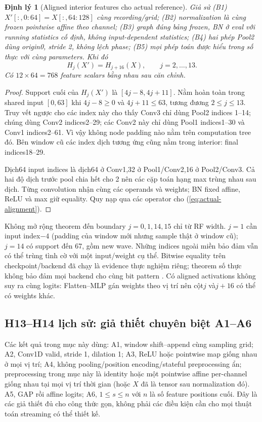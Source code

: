 \documentclass[11pt,a4paper]{article}
\newtheorem{theorem}[definition]{Định lý}
\theoremstyle{remark}
\begin{document}
\begin{theorem}[Aligned interior features cho actual reference]\label{th:actual-feature}
Giả sử (B1) $X'[:,0:64]=X[:,64:128]$ cùng recording/grid;
(B2) normalization là cùng frozen pointwise affine theo channel;
(B3) graph đúng bảng frozen, BN ở eval với running statistics cố định,
không input-dependent statistics;
(B4) hai phép Pool2 dùng origin0, stride 2, không lệch phase;
(B5) mọi phép toán được hiểu trong số thực với cùng parameters.
Khi đó
\begin{equation}
 H_j(X')=H_{j+16}(X),\qquad j=2,\ldots,13.
 \label{eq:actual-alignment}
\end{equation}
Có $12\times64=768$ feature scalars bằng nhau sau căn chỉnh.
\end{theorem}
\begin{proof}
Support cuối của $H_j(X')$ là $[4j-8,4j+11]$.
Nằm hoàn toàn trong shared input $[0,63]$ khi
$4j-8\ge0$ và $4j+11\le63$, tương đương $2\le j\le13$.
Truy vết ngược cho các index này cho thấy Conv3 chỉ dùng Pool2 indices
1--14; chúng dùng Conv2 indices2--29; các Conv2 này chỉ dùng Pool1
indices1--30 và Conv1 indices2--61. Vì vậy không node padding nào nằm
trên computation tree đó. Bên window cũ các index dịch tương ứng cũng
nằm trong interior: final indices18--29.

Dịch64 input indices là dịch64 ở Conv1,32 ở Pool1/Conv2,16 ở
Pool2/Conv3. Cả hai độ dịch trước pool chia hết cho 2 nên các cặp toán
hạng max trùng nhau sau dịch. Từng convolution nhận cùng các operands
và weights; BN fixed affine, ReLU và max giữ equality. Quy nạp qua các
operator cho (\ref{eq:actual-alignment}).
\end{proof}
Không mở rộng theorem đến boundary $j=0,1,14,15$ chỉ từ RF width.
$j=1$ cần input index$-4$ (padding của window mới nhưng sample thật ở
window cũ); $j=14$ có support đến 67, gồm new wave. Những indices ngoài
miền bảo đảm vẫn có thể trùng tình cờ với một input/weight cụ thể.
Bitwise equality trên checkpoint/backend đã chạy là evidence thực nghiệm
riêng; theorem số thực không bảo đảm mọi backend cho cùng bit pattern
\cite{pytorch-numerical}. Có aligned activations không suy ra cùng logits:
Flatten--MLP gán weights theo vị trí nên cột$j$ và$j+16$ có thể có weights khác.

\subsection{H13--H14 lịch sử: giả thiết chuyên biệt A1--A6}
Các kết quả trong mục này dùng: A1, window shift--append cùng sampling grid;
A2, Conv1D valid, stride 1, dilation 1; A3, ReLU hoặc pointwise map giống
nhau ở mọi vị trí; A4, không pooling/position encoding/stateful preprocessing
ẩn; preprocessing trong mục này là identity hoặc một pointwise affine
per-channel giống nhau tại mọi vị trí thời gian (hoặc $X$ đã là tensor sau
normalization đó). A5, GAP rồi affine logits; A6, $1\le s\le n$ với $n$ là số feature
positions cuối. Đây là các giả thiết đủ cho công thức gọn, không phải các
điều kiện cần cho mọi thuật toán streaming có thể thiết kế.
\end{document}
